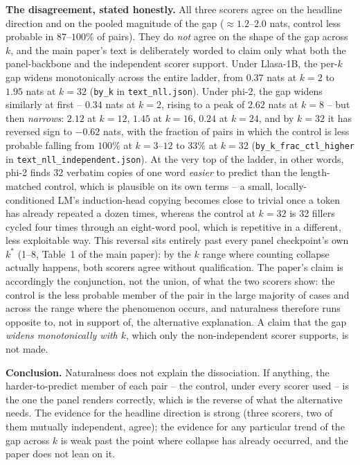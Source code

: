 \documentclass[11pt]{article}
\begin{document}
\textbf{The disagreement, stated honestly.} All three scorers agree on the
headline direction and on the pooled magnitude of the gap ($\approx 1.2$--$2.0$
nats, control less probable in $87$--$100\%$ of pairs). They do \emph{not}
agree on the shape of the gap across $k$, and the main paper's text is
deliberately worded to claim only what both the panel-backbone and the
independent scorer support. Under Llasa-1B, the per-$k$ gap widens
monotonically across the entire ladder, from $0.37$ nats at $k{=}2$ to $1.95$
nats at $k{=}32$ (\texttt{by\_k} in \texttt{text\_nll.json}). Under phi-2, the
gap widens similarly at first -- $0.34$ nats at $k{=}2$, rising to a peak of
$2.62$ nats at $k{=}8$ -- but then \emph{narrows}: $2.12$ at $k{=}12$, $1.45$
at $k{=}16$, $0.24$ at $k{=}24$, and by $k{=}32$ it has reversed sign to
$-0.62$ nats, with the fraction of pairs in which the control is less probable
falling from $100\%$ at $k{=}3$--$12$ to $33\%$ at $k{=}32$
(\texttt{by\_k\_frac\_ctl\_higher} in \texttt{text\_nll\_independent.json}).
At the very top of the ladder, in other words, phi-2 finds 32 verbatim copies
of one word \emph{easier} to predict than the length-matched control, which is
plausible on its own terms -- a small, locally-conditioned LM's induction-head
copying becomes close to trivial once a token has already repeated a dozen
times, whereas the control at $k{=}32$ is 32 fillers cycled four times through
an eight-word pool, which is repetitive in a different, less exploitable way.
This reversal sits entirely past every panel checkpoint's own $k^\ast$
(1--8, Table~1 of the main paper): by the $k$ range where
counting collapse actually happens, both scorers agree without qualification.
The paper's claim is accordingly the conjunction, not the union, of what the
two scorers show: the control is the less probable member of the pair in the
large majority of cases and across the range where the phenomenon occurs, and
naturalness therefore runs opposite to, not in support of, the alternative
explanation. A claim that the gap \emph{widens monotonically with $k$}, which
only the non-independent scorer supports, is not made.

\textbf{Conclusion.} Naturalness does not explain the dissociation. If
anything, the harder-to-predict member of each pair -- the control, under
every scorer used -- is the one the panel renders correctly, which is the
reverse of what the alternative needs. The evidence for the headline
direction is strong (three scorers, two of them mutually independent, agree);
the evidence for any particular trend of the gap across $k$ is weak past the
point where collapse has already occurred, and the paper does not lean on it.
\end{document}
